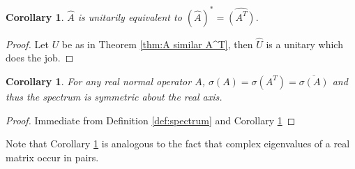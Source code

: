 \documentclass[12pt,a4paper,twoside]{article}
\numberwithin{equation}{section}
\theoremstyle{definition}  %
\theoremstyle{plain}  %
\newtheorem{cor}[defn]{Corollary}
\theoremstyle{remark} %
\begin{document}
\begin{cor}\label{cor:unitary-equi}
$\hat{A}$ is unitarily equivalent to $(\hat{A})^{*} =\widehat{(A^T)}.$
\end{cor}

\begin{proof}
Let $U$ be as in Theorem \ref{thm:A similar A^T}, then $\hat{U}$ is a unitary which does the job.
\end{proof}

\begin{cor} \label{cor:spectr-symmetry} For any real normal operator $A$,  
 $\sigma(A) =  \sigma(A^{T}) =\overline{\sigma(A)}$ and thus the spectrum is symmetric about the real axis.
\end{cor}

\begin{proof}
Immediate from Definition \ref{def:spectrum} and Corollary  \ref{cor:unitary-equi}
\end{proof}

 Note that Corollary \ref{cor:spectr-symmetry} is analogous to the fact that complex eigenvalues of a real matrix occur in pairs.
\end{document}
